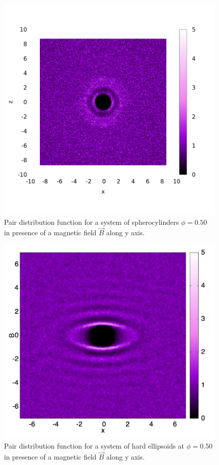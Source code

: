 \documentclass[aip,graphicx]{revtex4-1}
\begin{document}
\begin{figure}
    \centering
    \includegraphics[width=0.8\columnwidth]{gxz_B.png}
    \caption{Pair distribution function for a system of spherocylinders $\phi = 0.50$ in presence of a magnetic field $\vec{B}$ along y axis.}
    \label{fig:gxz_B}
\end{figure}

\begin{figure}
    \begin{center}
    \includegraphics[width=0.7\columnwidth]{gyz_B_HE.png}
    \caption{Pair distribution function for a system of hard ellipsoids at $\phi = 0.50$ in presence of a magnetic field $\vec{B}$ along y axis.}
    \label{fig:gyz_B_HE}
    \end{center}
\end{figure}
\end{document}
